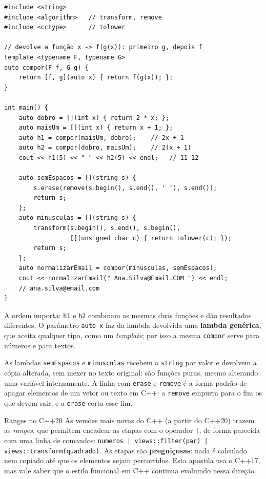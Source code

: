 \begin{codigo}
\begin{Verbatim}[breaklines=true, breaksymbolleft={}, fontsize=\footnotesize]
#include <string>
#include <algorithm>   // transform, remove
#include <cctype>      // tolower

// devolve a função x -> f(g(x)): primeiro g, depois f
template <typename F, typename G>
auto compor(F f, G g) {
    return [f, g](auto x) { return f(g(x)); };
}

int main() {
    auto dobro = [](int x) { return 2 * x; };
    auto maisUm = [](int x) { return x + 1; };
    auto h1 = compor(maisUm, dobro);    // 2x + 1
    auto h2 = compor(dobro, maisUm);    // 2(x + 1)
    cout << h1(5) << " " << h2(5) << endl;   // 11 12

    auto semEspacos = [](string s) {
        s.erase(remove(s.begin(), s.end(), ' '), s.end());
        return s;
    };
    auto minusculas = [](string s) {
        transform(s.begin(), s.end(), s.begin(),
                  [](unsigned char c) { return tolower(c); });
        return s;
    };
    auto normalizarEmail = compor(minusculas, semEspacos);
    cout << normalizarEmail(" Ana.Silva@Email.COM ") << endl;
    // ana.silva@email.com
}
\end{Verbatim}
\end{codigo}

A ordem importa: \texttt{h1} e \texttt{h2} combinam as mesmas duas funções e dão resultados diferentes. O parâmetro \texttt{auto x} faz da lambda devolvida uma \textbf{lambda genérica}, que aceita qualquer tipo, como um \textit{template}; por isso a mesma \texttt{compor} serve para números e para textos.

As lambdas \texttt{semEspacos} e \texttt{minusculas} recebem a \texttt{string} por valor e devolvem a cópia alterada, sem mexer no texto original: são funções puras, mesmo alterando uma variável internamente. A linha com \texttt{erase} e \texttt{remove} é a forma padrão de apagar elementos de um vetor ou texto em C++: a \texttt{remove} empurra para o fim os que devem sair, e a \texttt{erase} corta esse fim.

\begin{destaque}{Ranges no C++20}
As versões mais novas do C++ (a partir do C++20) trazem as \textit{ranges}, que permitem encadear as etapas com o operador \texttt{|}, de forma parecida com uma linha de comandos: \texttt{numeros | views::filter(par) | views::transform(quadrado)}. As etapas são \textbf{preguiçosas}: nada é calculado nem copiado até que os elementos sejam percorridos. Esta apostila usa o C++17, mas vale saber que o estilo funcional em C++ continua evoluindo nessa direção.
\end{destaque}

